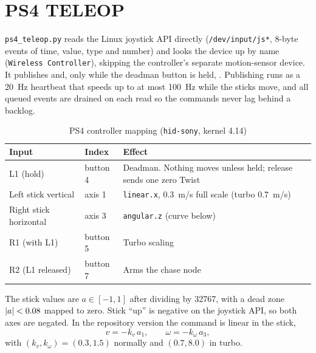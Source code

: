 \section{PS4 TELEOP}

\texttt{ps4\_teleop.py} reads the Linux joystick API directly
(\texttt{/dev/input/js*}, 8-byte events of time, value, type and number) and
looks the device up by name (\texttt{Wireless Controller}), skipping the
controller's separate motion-sensor device. It publishes  and,
only while the deadman button is held, . Publishing runs as a
\SI{20}{Hz} heartbeat that speeds up to at most \SI{100}{Hz} while the sticks
move, and all queued events are drained on each read so the commands never
lag behind a backlog.

\begin{table}[htbp]
\centering
\caption{PS4 controller mapping (\texttt{hid-sony}, kernel 4.14)}
\label{tab:ps4}
\small
\begin{tabular}{lll}
\toprule
Input & Index & Effect \\
\midrule
L1 (hold) & button 4 & Deadman. Nothing moves unless held; release sends one zero Twist \\
Left stick vertical & axis 1 & \texttt{linear.x}, \SI{0.3}{m/s} full scale (turbo \SI{0.7}{m/s}) \\
Right stick horizontal & axis 3 & \texttt{angular.z} (curve below) \\
R1 (with L1) & button 5 & Turbo scaling \\
R2 (L1 released) & button 7 & Arms the chase node \\
\bottomrule
\end{tabular}
\end{table}

The stick values are $a\in[-1,1]$ after dividing by \num{32767}, with a dead
zone $\left\lvert a \right\rvert<0.08$ mapped to zero. Stick ``up'' is negative on the joystick
API, so both axes are negated. In the repository version the command is
linear in the stick,
\begin{equation}\label{eq:teleop}
v = -k_v\,a_1,\qquad \omega = -k_\omega\,a_3,
\end{equation}
with $(k_v,k_\omega)=(0.3,1.5)$ normally and $(0.7,8.0)$ in turbo.


